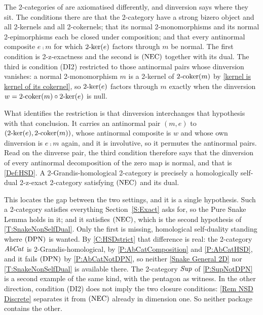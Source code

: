 \begin{remark}
  \label{Rem Grandis}
  The 2-categories of \cite{CavJanMesRei26} are axiomatised differently, and dinversion says where they sit. The conditions there are that the 2-category have a strong bizero object and all 2-kernels and all 2-cokernels; that its normal 2-monomorphisms and its normal 2-epimorphisms each be closed under composition; and that every antinormal composite \(e\comp m\) for which \(2\text{-}\mathrm{ker}(e)\) factors through \(m\) be normal. The first condition is 2-z-exactness and the second is \(\textup{(NEC)}\) together with its dual. The third is condition \textup{(DI2)} restricted to those antinormal pairs whose dinversion vanishes: a normal 2-monomorphism \(m\) is a 2-kernel of \(2\text{-}\mathrm{coker}(m)\) by \prox\ref{kernel is kernel of its cokernel}, so \(2\text{-}\mathrm{ker}(e)\) factors through \(m\) exactly when the dinversion \(w=2\text{-}\mathrm{coker}(m)\circ2\text{-}\mathrm{ker}(e)\) is null.

	What identifies the restriction is that dinversion interchanges that hypothesis with that conclusion. It carries an antinormal pair \((m,e)\) to \((2\text{-}\mathrm{ker}(e),2\text{-}\mathrm{coker}(m))\), whose antinormal composite is \(w\) and whose own dinversion is \(e\comp m\) again, and it is involutive, so it permutes the antinormal pairs. Read on the dinverse pair, the third condition therefore says that the dinversion of every antinormal decomposition of the zero map is normal, and that is \ref{Def:HSD}. A 2-Grandis-homological 2-category is precisely a homologically self-dual 2-z-exact 2-category satisfying \(\textup{(NEC)}\) and its dual.

	This locates the gap between the two settings, and it is a single hypothesis. Such a 2-category satisfies everything Section~\ref{S:Exact} asks for, so the Pure Snake Lemma holds in it; and it satisfies \(\textup{(NEC)}\), which is the second hypothesis of \thex\ref{T:SnakeNonSelfDual}. Only the first is missing, homological self-duality standing where \(\textup{(DPN)}\) is wanted. By \corx\ref{C:HSDstrict} that difference is real: the 2-category \(\mathit{AbCat}\) is 2-Grandis-homological, by \prox\ref{P:AbCatComposition} and \prox\ref{P:AbCatHSD}, and it fails \(\textup{(DPN)}\) by \prox\ref{P:AbCatNotDPN}, so neither \thex\ref{Snake General 2D} nor \thex\ref{T:SnakeNonSelfDual} is available there. The 2-category \(\mathit{Sup}\) of \prox\ref{P:SupNotDPN} is a second example of the same kind, with the pentagon as witness. In the other direction, condition \textup{(DI2)} does not imply the two closure conditions: \remx\ref{Rem NSD Discrete} separates it from \(\textup{(NEC)}\) already in dimension one. So neither package contains the other.
\end{remark}

